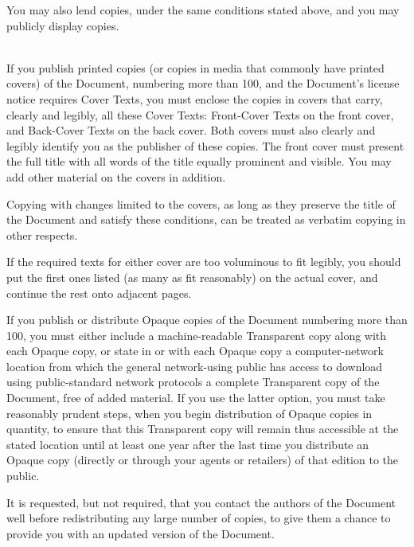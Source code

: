 You may also lend copies, under the same conditions stated above, and you may publicly display copies.


\bigskip{}\\

\noindent
If you publish printed copies (or copies in media that commonly have printed covers) of the Document, numbering more than 100, and the Document's license notice requires Cover Texts, you must enclose the copies in covers that carry, clearly and legibly, all these Cover Texts: Front-Cover Texts on the front cover, and Back-Cover Texts on the back cover.  Both covers must also clearly and legibly identify you as the publisher of these copies.  The front cover must present the full title with all words of the title equally prominent and visible.  You may add other material on the covers in addition. 

Copying with changes limited to the covers, as long as they preserve the title of the Document and satisfy these conditions, can be treated as verbatim copying in other respects.

If the required texts for either cover are too voluminous to fit legibly, you should put the first ones listed (as many as fit reasonably) on the actual cover, and continue the rest onto adjacent pages.

If you publish or distribute Opaque copies of the Document numbering more than 100, you must either include a machine-readable Transparent copy along with each Opaque copy, or state in or with each Opaque copy a computer-network location from which the general network-using public has access to download using public-standard network protocols
a complete Transparent copy of the Document, free of added material. If you use the latter option, you must take reasonably prudent steps, when you begin distribution of Opaque copies in quantity, to ensure that this Transparent copy will remain thus accessible at the stated location until at least one year after the last time you distribute an Opaque copy (directly or through your agents or retailers) of that edition to the public.

It is requested, but not required, that you contact the authors of the Document well before redistributing any large number of copies, to give them a chance to provide you with an updated version of the Document.


\bigskip{}\\

